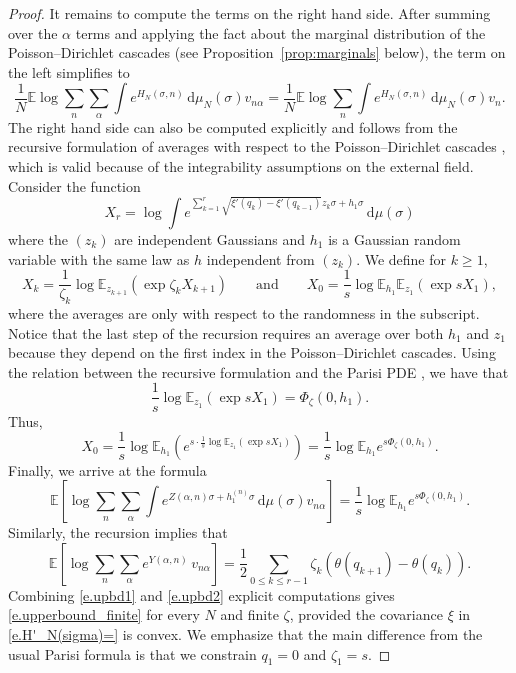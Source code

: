 \documentclass[11pt]{amsart}
\theoremstyle{remark}
\theoremstyle{definition}
\numberwithin{equation}{section}
\numberwithin{proposition}{section}
\numberwithin{figure}{section}
\numberwithin{table}{section}
\newcommand{\E}{\mathbb{E}}
\renewcommand{\leq}{\leqslant}
\renewcommand{\geq}{\geqslant}
\newcommand{\Ll}{\left}
\newcommand{\Rr}{\right}
\renewcommand{\d}{\mathrm{d}}
\newcommand{\1}{\mathbf{1}}
\newcommand{\pnp}{{(n)}}
\begin{document}
\begin{proof}
It remains to compute the terms on the right hand side. After summing over the $\alpha$ terms and applying the fact about the marginal distribution of the Poisson--Dirichlet cascades (see Proposition~\ref{prop:marginals} below), the term on the left simplifies to
 \begin{equation}\label{e.marginals}
 	\frac{1}{N} \E \log \sum_{n} \sum_{\alpha} \int e^{H_N(\sigma,n) } \, \d\mu_N(\sigma) v_{n\alpha} = \frac{1}{N} \E \log \sum_{n}  \int e^{H_N(\sigma,n) } \, \d\mu_N(\sigma) v_{n}.
 \end{equation} 
 The right hand side can also be computed explicitly and follows from the recursive formulation of averages with respect to the Poisson--Dirichlet cascades \cite[Theorem~2.9]{pan}, which is valid because of the integrability assumptions on the external field. Consider the function
 \begin{equation}\label{e.recursive}
 X_r = \log \int e^{ \sum_{k = 1}^{r} \sqrt{ \xi'(q_{k}) - \xi'(q_{k-1}) }z_{k}  \sigma + h_1 \sigma } \, \d\mu(\sigma) 
 \end{equation}
 where the $(z_{k})$ are independent Gaussians and $h_1$ is a Gaussian random variable with the same law as $h$ independent from $(z_k)$. 
 We define for $k \geq 1$,
 \[
 X_k = \frac{1}{\zeta_k} \log \E_{z_{k + 1}} \Ll( \exp \zeta_k X_{k + 1} \Rr) \qquad\text{and}\qquad  X_0 = \frac{1}{s} \log \E_{h_1}\E_{z_{1}} \Ll( \exp s X_{1}  \Rr),
 \]
 where the averages are only with respect to the randomness in the subscript. Notice that the last step of the recursion requires an average over both $h_1$ and $z_1$ because they depend on the first index in the Poisson--Dirichlet cascades. Using the relation between the recursive formulation and the Parisi PDE \cite[Bonus Chapter A.2]{pan}, we have that
 \[
\frac{1}{s} \log \E_{z_{1}} \Ll( \exp s X_{1}  \Rr) = \Phi_{\zeta}(0,h_1).
 \]
Thus,
\[
X_0 = \frac{1}{s} \log \E_{h_1} \Ll( e^{ s\cdot \frac{1}{s} \log \E_{z_{1}} \Ll( \exp s X_{1}  \Rr)} \Rr) = \frac{1}{s} \log \E_{h_1} e^{s \Phi_{\zeta}(0,h_1)}.
\]
Finally, we arrive at the formula
\begin{equation}\label{e.upbd1}
\E \Ll[ \log \sum_{n} \sum_{\alpha}  \int e^{Z(\alpha,n) \sigma + h_1^\pnp \sigma } \, \d\mu(\sigma) v_{n \alpha} \Rr] = \frac{1}{s} \log \E_{h_1} e^{s \Phi_{\zeta}(0,h_1)}.
\end{equation}
Similarly, the recursion implies that
\begin{equation}\label{e.upbd2}
\E \Ll[ \log \sum_{n} \sum_{\alpha} e^{Y(\alpha,n) } \, v_{n \alpha} \Rr] = \frac{1}{2} \sum_{0 \leq k \leq r - 1} \zeta_k ( \theta(q_{k + 1})- \theta(q_k) ).
\end{equation}
Combining \eqref{e.upbd1} and \eqref{e.upbd2} explicit computations gives \eqref{e.upperbound_finite} for every $N$ and finite $\zeta$, provided the covariance $\xi$ in \eqref{e.H'_N(sigma)=} is convex. We emphasize that the main difference from the usual Parisi formula is that we constrain $q_1 = 0$ and $\zeta_1 = s$.


\end{proof}
\end{document}
